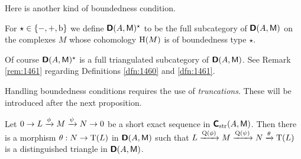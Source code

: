 Here is another kind of boundedness condition. 

\begin{dfn} \label{dfn:1461}
For $\star \in \{ -, +, \mathrm{b} \}$ we define
$\boldsymbol{\mathsf{D}}(A, \operatorname{\mathsf{M}})^{\star}$
to be the full subcategory of $\boldsymbol{\mathsf{D}}(A, \operatorname{\mathsf{M}})^{}$
on the complexes $M$ whose cohomology $\operatorname{H}(M)$ is of boundedness type 
$\star$. 
\end{dfn}

Of course $\boldsymbol{\mathsf{D}}(A, \operatorname{\mathsf{M}})^{\star}$ is a full triangulated subcategory 
of $\boldsymbol{\mathsf{D}}(A, \operatorname{\mathsf{M}})$. 
See Remark \ref{rem:1461} regarding Definitions \ref{dfn:1460} and 
\ref{dfn:1461}. 

Handling boundedness conditions requires the use of {\em truncations}. These 
will be introduced after the next proposition. 

\begin{prop} \label{prop:2165}
Let 
$0 \to L \xrightarrow{\phi} M \xrightarrow{\psi} N \to 0$ 
be a short exact sequence in $\boldsymbol{\mathsf{C}}_{\mathrm{str}}(A, \operatorname{\mathsf{M}})$. 
Then there is a morphism $\theta : N \to \operatorname{T}(L)$ in $\boldsymbol{\mathsf{D}}(A, \operatorname{\mathsf{M}})$ 
such that 
$L \xrightarrow{\operatorname{Q}(\phi)} M \xrightarrow{\operatorname{Q}(\psi)} N \xrightarrow{\theta} \operatorname{T}(L)$
is a distinguished triangle in $\boldsymbol{\mathsf{D}}(A, \operatorname{\mathsf{M}})$.
\end{prop}

